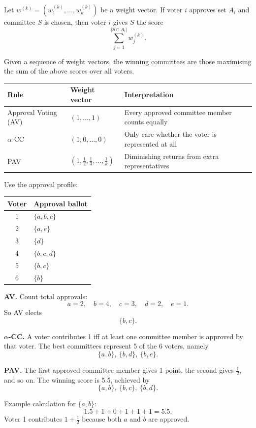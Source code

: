 \begin{defbox}
Let $w^{(k)}=(w^{(k)}_1,\ldots,w^{(k)}_k)$ be a weight vector. If voter $i$ approves set $A_i$ and committee $S$ is chosen, then voter $i$ gives $S$ the score
\[
  \sum_{j=1}^{|S\cap A_i|} w^{(k)}_j.
\]
\end{defbox}

\begin{defbox}
Given a sequence of weight vectors, the winning committees are those maximising the sum of the above scores over all voters.
\end{defbox}

\begin{center}
\renewcommand{\arraystretch}{1.25}
\begin{tabular}{@{}p{2.4cm}p{3.8cm}p{4.7cm}@{}}
\toprule
\textbf{Rule} & \textbf{Weight vector} & \textbf{Interpretation} \\
\midrule
Approval Voting (AV) & $(1,\ldots,1)$ & Every approved committee member counts equally \\
$\alpha$-CC & $(1,0,\ldots,0)$ & Only care whether the voter is represented at all \\
PAV & $(1,\frac12,\frac13,\ldots,\frac1k)$ & Diminishing returns from extra representatives \\
\bottomrule
\end{tabular}
\end{center}

\begin{exbox}
Use the approval profile:

\begin{center}
\renewcommand{\arraystretch}{1.15}
\begin{tabular}{@{}cl@{}}
\toprule
\textbf{Voter} & \textbf{Approval ballot} \\
\midrule
1 & $\{a,b,c\}$ \\
2 & $\{a,e\}$ \\
3 & $\{d\}$ \\
4 & $\{b,c,d\}$ \\
5 & $\{b,c\}$ \\
6 & $\{b\}$ \\
\bottomrule
\end{tabular}
\end{center}

\textbf{AV.} Count total approvals:
\[
  a=2,\quad b=4,\quad c=3,\quad d=2,\quad e=1.
\]
So AV elects
\[
  \{b,c\}.
\]

\textbf{$\alpha$-CC.} A voter contributes 1 iff at least one committee member is approved by that voter. The best committees represent 5 of the 6 voters, namely
\[
  \{a,b\},\ \{b,d\},\ \{b,e\}.
\]

\textbf{PAV.} The first approved committee member gives 1 point, the second gives $\frac12$, and so on. The winning score is 5.5, achieved by
\[
  \{a,b\},\ \{b,c\},\ \{b,d\}.
\]

Example calculation for $\{a,b\}$:
\[
  1.5 + 1 + 0 + 1 + 1 + 1 = 5.5.
\]
Voter 1 contributes $1+\frac12$ because both $a$ and $b$ are approved.
\end{exbox}

